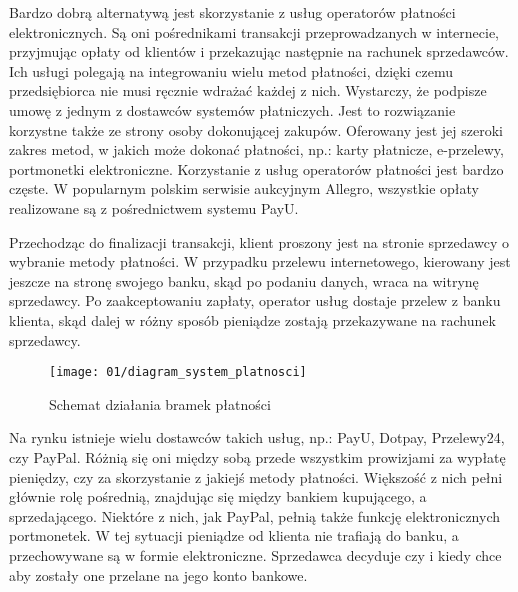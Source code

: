Bardzo dobrą alternatywą jest skorzystanie z usług operatorów płatności elektronicznych. Są oni pośrednikami transakcji przeprowadzanych w internecie, przyjmując opłaty od klientów i przekazując następnie na rachunek sprzedawców. Ich usługi polegają na integrowaniu wielu metod płatności, dzięki czemu przedsiębiorca nie musi ręcznie wdrażać każdej z nich. Wystarczy, że podpisze umowę z jednym z dostawców systemów płatniczych. Jest to rozwiązanie korzystne także ze strony osoby dokonującej zakupów. Oferowany jest jej szeroki zakres metod, w jakich może dokonać płatności, np.: karty płatnicze, e-przelewy, portmonetki elektroniczne. Korzystanie z usług operatorów płatności jest bardzo częste. W popularnym polskim serwisie aukcyjnym Allegro, wszystkie opłaty realizowane są z pośrednictwem systemu PayU.

Przechodząc do finalizacji transakcji, klient proszony jest na stronie sprzedawcy o wybranie metody płatności. W przypadku przelewu internetowego, kierowany jest jeszcze na stronę swojego banku, skąd po podaniu danych, wraca na witrynę sprzedawcy. Po zaakceptowaniu zapłaty, operator usług dostaje przelew z banku klienta, skąd dalej w różny sposób pieniądze zostają przekazywane na rachunek sprzedawcy.
\begin{figure}[h]
	\begin{center}
		\texttt{[image: 01/diagram\_system\_platnosci]}
	\end{center}
	\caption{Schemat działania bramek płatności}
\end{figure}
Na rynku istnieje wielu dostawców takich usług, np.: PayU, Dotpay, Przelewy24, czy PayPal. Różnią się oni między sobą przede wszystkim prowizjami za wypłatę pieniędzy, czy za skorzystanie z jakiejś metody płatności. Większość z nich pełni głównie rolę pośrednią, znajdując się między bankiem kupującego, a sprzedającego. Niektóre z nich, jak PayPal, pełnią także funkcję elektronicznych portmonetek. W tej sytuacji pieniądze od klienta nie trafiają do banku, a przechowywane są w formie elektroniczne. Sprzedawca decyduje czy i kiedy chce aby zostały one przelane na jego konto bankowe. 